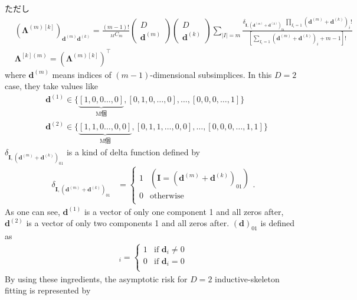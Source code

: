 \documentclass{article}
\begin{document}
ただし
\begin{align}
&({\bm \Lambda}^{(m)[k]})_{ \bm d ^{(m)} \bm d ^{(k)} }
= %
\frac{(m-1)!}{\ _{M} C_m}
\begin{pmatrix}
D \\
{\bm d}^{(m)}
\end{pmatrix}
%
\begin{pmatrix}
D \\
{\bm d}^{(k)}
\end{pmatrix}
%
\sum_{  |I| = m  }
\frac{
\delta_{{\bm I}, (\bm d ^{(m)} +  \bm d ^{(k)} )_{01} }
\prod_{I_i = 1}( \bm d ^{(m)} +  \bm d ^{(k)}  )_i !}{
[\sum_{I_i = 1} ( \bm d ^{(m)} +  \bm d ^{(k)}  )_i 
+ m - 1]!
}
\\
&
{\bm \Lambda}^{[k](m)}
=
({\bm \Lambda}^{(m)[k]})^\top
\end{align}
\normalsize
where $\bm d^{(m)}$ means indices of $(m-1)$-dimensional subsimplices. In this $D=2$ case, they take values like
\begin{align}
&
\bm d^{(1)} \in \Big\{
\underbrace{ [1, 0, 0 \dots, 0] }_\text{M個},
[0,1, 0, \dots, 0], \dots, [0, 0, 0, \dots, 1]
\Big\}
\label{7}
\\
&
\bm d^{(2)} \in \Big\{
\underbrace{ [1, 1, 0 \dots, 0, 0] }_\text{M個},
[0,1, 1, \dots, 0, 0], \dots, [0, 0, 0,\dots, 1, 1]
\Big\}
\label{8}
\end{align}
$\delta_{{\bm I}, (\bm d ^{(m)} +  \bm d ^{(k)} )_{01} }$ is a kind of delta function defined by
\begin{align}
\delta_{{\bm I}, (\bm d ^{(m)} +  \bm d ^{(k)} )_{01} }
&=
\left\{ \begin{array}{ll}
1 & ( {\bm I} = (\bm d ^{(m)} +  \bm d ^{(k)} )_{01}  ) \\
0 & \text{otherwise}\\
\end{array} \right.
.
\end{align}
As one can see, $\bm d^{(1)}$ is a vector of only one component 1 and all zeros after,  $\bm d^{(2)}$ is a vector of only two components 1 and all zeros after.
$(\bm d)_{01}$ is defined as
\begin{align}
[(\bm d)_{01}]_i
=
\left\{ \begin{array}{ll}
1 & \text{if $\bm d_i \neq 0$} \\
0 & \text{if $\bm d_i = 0$}\\
\end{array} \right.
\end{align}
By using these ingredients, the asymptotic risk for $D=2$ inductive-skeleton fitting is represented by
\end{document}
